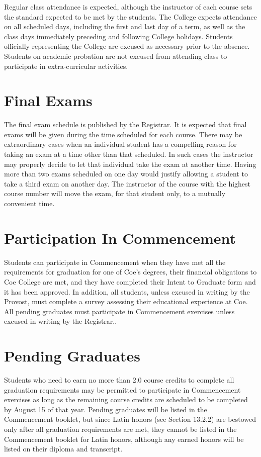 \documentclass[
  letterpaper,
]{scrbook}
\begin{document}
Regular class attendance is expected, although the instructor of each
course sets the standard expected to be met by the students. The College
expects attendance on all scheduled days, including the first and last
day of a term, as well as the class days immediately preceding and
following College holidays. Students officially representing the College
are excused as necessary prior to the absence. Students on academic
probation are not excused from attending class to participate in
extra-curricular activities.

\section{Final Exams}\label{final-exams}

The final exam schedule is published by the Registrar. It is expected
that final exams will be given during the time scheduled for each
course. There may be extraordinary cases when an individual student has
a compelling reason for taking an exam at a time other than that
scheduled. In such cases the instructor may properly decide to let that
individual take the exam at another time. Having more than two exams
scheduled on one day would justify allowing a student to take a third
exam on another day. The instructor of the course with the highest
course number will move the exam, for that student only, to a mutually
convenient time.

\section{Participation In
Commencement}\label{participation-in-commencement}

Students can participate in Commencement when they have met all the
requirements for graduation for one of Coe's degrees, their financial
obligations to Coe College are met, and they have completed their Intent
to Graduate form and it has been approved. In addition, all students,
unless excused in writing by the Provost, must complete a survey
assessing their educational experience at Coe. All pending graduates
must participate in Commencement exercises unless excused in writing by
the Registrar..

\section{Pending Graduates}\label{pending-graduates}

Students who need to earn no more than 2.0 course credits to complete
all graduation requirements may be permitted to participate in
Commencement exercises as long as the remaining course credits are
scheduled to be completed by August 15 of that year. Pending graduates
will be listed in the Commencement booklet, but since Latin honors (see
Section 13.2.2) are bestowed only after all graduation requirements are
met, they cannot be listed in the Commencement booklet for Latin honors,
although any earned honors will be listed on their diploma and
transcript.
\end{document}
